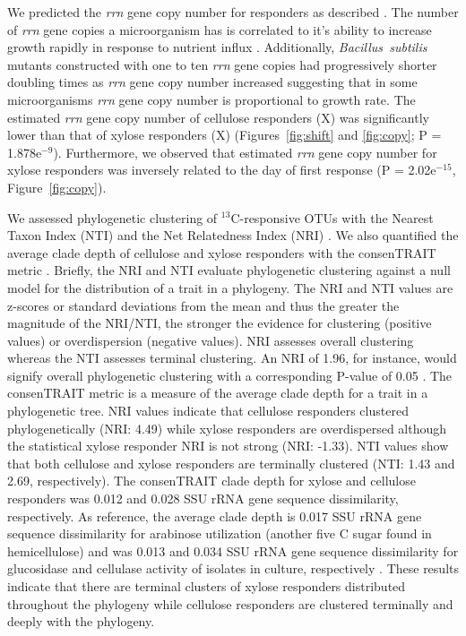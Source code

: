 We predicted the \textit{rrn} gene copy number for responders as described
\citep{Kembel_2012}. The number of \textit{rrn} gene copies
a microorganism has is correlated to it's ability to increase growth
rapidly in response to nutrient influx \citep{Klappenbach_2000}.
Additionally, \textit{Bacillus~subtilis} mutants constructed with one to
ten \textit{rrn} gene copies had progressively shorter doubling times as
\textit{rrn} gene copy number increased \citep{yano_multiple_2013}
suggesting that in some microorganisms \textit{rrn} gene copy number is
proportional to growth rate. The estimated \textit{rrn} gene
copy number of cellulose responders (X) was significantly lower than that
of xylose responders (X) (Figures~\ref{fig:shift} and \ref{fig:copy};
P = 1.878e$^{-9}$). Furthermore, we observed that estimated \textit{rrn}
gene copy number for xylose responders was inversely related to the day of
first response (P = 2.02e$^{-15}$, Figure~\ref{fig:copy}).

We assessed phylogenetic clustering of $^{13}$C-responsive OTUs with the
Nearest Taxon Index (NTI) and the Net Relatedness Index (NRI)
\citep{Webb2000}. We also quantified the average clade depth of cellulose and
xylose responders with the consenTRAIT metric \citep{Martiny2013}. Briefly, the
NRI and NTI evaluate phylogenetic clustering against a null model for the
distribution of a trait in a phylogeny. The NRI and NTI values are z-scores or
standard deviations from the mean and thus the greater the magnitude of the
NRI/NTI, the stronger the evidence for clustering (positive values) or
overdispersion (negative values). NRI assesses overall clustering whereas the
NTI assesses terminal clustering. An NRI of 1.96, for instance, would signify
overall phylogenetic clustering with a corresponding P-value of 0.05
\citep{Evans2014a}. The consenTRAIT metric is a measure of the average clade
depth for a trait in a phylogenetic tree. NRI values indicate that cellulose
responders clustered phylogenetically (NRI: 4.49) while xylose responders are
overdispersed although the statistical xylose responder NRI is not strong (NRI:
-1.33). NTI values show that both cellulose and xylose responders are
terminally clustered (NTI: 1.43 and 2.69, respectively). The consenTRAIT clade
depth for xylose and cellulose responders was 0.012 and 0.028 SSU rRNA gene
sequence dissimilarity, respectively. As reference, the average clade depth is
0.017 SSU rRNA gene sequence dissimilarity for arabinose utilization (another
five C sugar found in hemicellulose) and was 0.013 and 0.034 SSU rRNA gene
sequence dissimilarity for glucosidase and cellulase activity of isolates in
culture, respectively \citep{Martiny2013,Berlemont2013}. These results
indicate that there are terminal clusters of xylose responders distributed
throughout the phylogeny while cellulose responders are clustered terminally
and deeply with the phylogeny.
